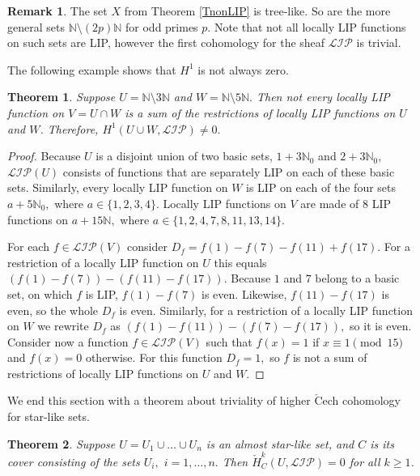 \documentclass[10pt]{article}
\newtheorem{theorem}{Theorem}
\theoremstyle{definition}
\newtheorem{remark}{Remark}
\begin{document}
\begin{remark} The set $X$ from Theorem \ref{TnonLIP} is tree-like. So are the more general sets $\mathbb N \setminus (2p)\mathbb N$ for odd primes $p$. Note that not all locally LIP functions on such sets are LIP, however the first cohomology for the sheaf $\mathcal{LIP}$ is trivial.
\end{remark}


The following example shows that $H^1$ is not always zero.
\begin{theorem} \label{TH1not0} Suppose $U=\mathbb N \setminus 3\mathbb N$ and $W=\mathbb N \setminus 5\mathbb N.$ Then not every locally LIP function on $V=U\cap W$ is a sum of the restrictions of locally LIP functions on $U$ and $W$. Therefore, $H^1(U\cup W, \mathcal{LIP}) \neq 0.$
\end{theorem}

\begin{proof} Because $U$ is a disjoint union of two basic sets, $1+3\mathbb N_0$ and $2+3\mathbb N_0,$ $\mathcal{LIP} (U)$ consists of functions that are separately LIP on each of these basic sets. Similarly, every locally LIP function on $W$ is LIP on each of the four sets $a+5\mathbb N_0,$ where $a\in \{1,2,3,4\}.$ Locally LIP functions on $V$ are made of $8$ LIP functions on $a+15\mathbb N,$ where $a\in \{1,2,4,7,8,11,13,14\}.$

For each $f\in \mathcal{LIP}(V)$ consider $D_f=f(1)-f(7)-f(11)+f(17).$ For a restriction of a locally LIP function on $U$ this equals $(f(1)-f(7))-(f(11)-f(17)).$ Because $1$ and $7$ belong to a basic set, on which $f$ is LIP, $f(1)-f(7)$ is even. Likewise, $f(11)-f(17)$ is even, so the whole  $D_f$ is even.  Similarly, for a restriction of a locally LIP function on $W$ we rewrite $D_f$ as $(f(1)-f(11))-(f(7)-f(17)),$ so it is even. Consider now a function $f\in \mathcal{LIP}(V)$ such that $f(x)=1$ if $x\equiv 1 \pmod {15}$ and $f(x)=0$ otherwise. For this function $D_f=1,$ so $f$ is not a sum of restrictions of locally LIP functions on $U$ and $W.$
\end{proof}

We end this section with a theorem about triviality of higher $\check{\textrm{C}}$ech cohomology for star-like sets.

\begin{theorem} \label{THkstar} Suppose $U=U_1\cup \ldots \cup U_n$ is an almost star-like set, and $C$ is its cover consisting of the sets $U_i,$ $i=1,\dots, n.$ Then $\check{H}^k_C(U,\mathcal{LIP})=0$ for all $k\geq 1$.
\end{theorem}
\end{document}

